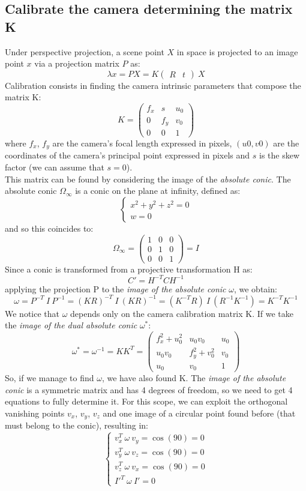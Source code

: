 \documentclass{article}
\begin{document}
\subsection{Calibrate the camera determining the matrix K}
Under perspective projection, a scene point $X$ in space is projected to an image point $x$ via a projection matrix $P$ as:
\begin{equation}
\lambda x = PX = K \begin{pmatrix} R & t \end{pmatrix} \: X
\end{equation}
Calibration consists in finding the camera intrinsic parameters that compose the matrix K:
$$ K = \begin{pmatrix}
f_x & s & u_0 \\
0 & f_y & v_0 \\
0 & 0 & 1
\end{pmatrix}
$$
where $f_x$, $f_y$ are the camera’s focal length expressed in pixels, $(u0, v0)$ are the coordinates of the camera’s principal point expressed in pixels and $s$ is the skew factor (we can assume that $s = 0$).\\
This matrix can be found by considering the image of the \textit{absolute conic}. The absolute conic $\Omega_\infty$ is a conic on the plane at infinity, defined as:
$$ \begin{cases}
x^2 + y^2 + z^2 = 0 \\
w = 0
\end{cases}
$$
and so this coincides to:
$$
\Omega_\infty = \begin{pmatrix}
1 & 0 & 0 \\
0 & 1 & 0 \\
0 & 0 & 1
\end{pmatrix} = I
$$
Since a conic is transformed from a projective transformation H as:
$$ C' = H^{-T} C H^{-1} $$
applying the projection P to the \textit{image of the absolute conic} $\omega$, we obtain:
$$
\omega = P^{-T} \: I \: P^{-1} = (KR)^{-T} \: I \: (KR)^{-1} = (K^{-T}R) \: I \: (R^{-1}K^{-1}) = K^{-T}K^{-1}
$$
We notice that $\omega$ depends only on the camera calibration matrix K.
If we take the \textit{image of the dual absolute conic} $\omega^*$:
$$ \omega^* = \omega^{-1} = KK^T = \begin{pmatrix}
f_x^2+u_0^2 & u_0v_0 & u_0 \\
u_0v_0 & f_y^2+v_0^2 & v_0 \\
u_0 & v_0 & 1
\end{pmatrix}
$$
So, if we manage to find $\omega$, we have also found K. The \textit{image of the absolute conic} is a symmetric matrix and has 4 degrees of freedom, so we need to get 4 equations to fully determine it. For this scope, we can exploit the orthogonal vanishing points $v_x$, $v_y$, $v_z$ and one image of a circular point found before (that must belong to the conic), resulting in:
$$
\begin{cases}
v_x^T \: \omega \: v_y = \cos (90) = 0 \\
v_y^T \: \omega \: v_z = \cos (90) = 0 \\
v_z^T \: \omega \: v_x = \cos (90) = 0 \\
I'^T \: \omega \: I' = 0
\end{cases}
$$
\end{document}
